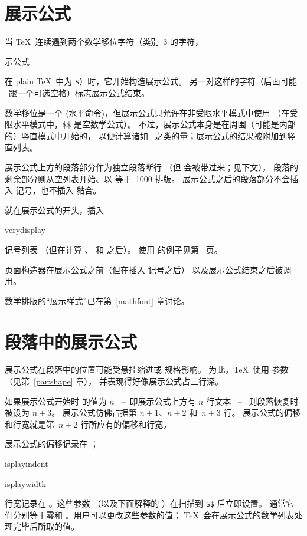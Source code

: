 \documentclass[a4paper]{rapport3}
\makeatletter
\def\gr#1{$\langle$#1$\rangle$}\def\key#1{{\tt#1}}
\def\alt{}\def\altt{}%
\def\ldash{\unskip\ --\nobreak\ \ignorespaces}
\def\rdash{\unskip\nobreak\ --\ \ignorespaces}
\def\term#1\par{\index{#1}}
\def\cstoidx#1\par{\index{#1@\cs{#1}}}
\def\csidx#1{\cstoidx #1\par\cs{#1}}
\makeatother
\begin{document}
\section{展示公式}

当 \TeX\ 连续遇到两个数学移位字符（类别~3 的字符，
\term 展示公式\par
在 plain \TeX\ 中为 \verb>$>）时，它开始构造展示公式。
另一对这样的字符（后面可能 \alt\ 跟一个可选空格）标志展示公式结束。

数学移位是一个 \gr{水平命令}，但展示公式只允许在非受限水平模式中使用
（在受限水平模式中，\verb>$$> 是空数学公式）。
不过，展示公式本身是在周围（可能是内部的）竖直模式中开始的，
以便计算诸如~ 之类的量；展示公式的结果被附加到竖直列表。

展示公式上方的段落部分作为独立段落断行
（但  会被带过来；见下文），
段落的剩余部分则从空列表开始、以  等于~1000 排版。
展示公式之后的段落部分不会插入  记号，也不插入  黏合。

就在展示公式的开头，插入 \csidx{everydisplay} 记号列表
（但在计算 、 和  之后）。
使用  的例子见第~\pageref{left:display} 页。

页面构造器在展示公式之前（但在插入  记号之后）
以及展示公式结束之后被调用。

数学排版的“展示样式”已在第~\ref{mathfont} 章讨论。

\section{段落中的展示公式}

展示公式在段落中的位置可能受悬挂缩进或  规格影响。
为此，\TeX\ 使用  参数（见第~\ref{par:shape} 章），
并表现得好像展示公式占三行深。

如果展示公式开始时  的值为 $n$
\ldash 即展示公式上方有 $n$ 行文本 \rdash
则段落恢复时  被设为 $n+3$。
展示公式仿佛占据第 $n+1$、$n+2$ 和~$n+3$ 行。
展示公式的偏移和行宽就是第~$n+2$ 行所应有的偏移和行宽。

展示公式的偏移记录在 ；
\cstoidx displayindent\par\cstoidx displaywidth\par
行宽记录在 。这些参数
（以及下面解释的 ）在扫描到 \verb>$$> 后立即设置。
通常它们分别等于零和 。用户可以更改这些参数的值；
\TeX\ 会在展示公式的数学列表处理完毕后所取的值。
\end{document}
